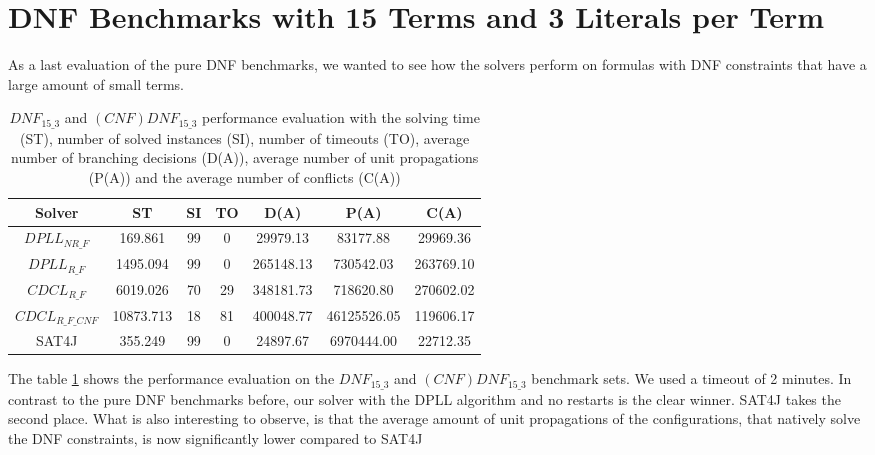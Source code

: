 \section{DNF Benchmarks with 15 Terms and 3 Literals per Term}
\label{sec:dnf153}

As a last evaluation of the pure DNF benchmarks, we wanted to see how the solvers perform on formulas with DNF constraints that have a large amount of small terms.

\begin{table}[!htb]
\centering
\caption[$DNF_{15\_3}$ and $(CNF)DNF_{15\_3}$ performance evaluation]{$DNF_{15\_3}$ and $(CNF)DNF_{15\_3}$ performance evaluation with the solving time (ST), number of solved instances (SI), number of timeouts (TO), average number of branching decisions (D(A)), average number of unit propagations (P(A)) and the average number of conflicts (C(A))}
\label{tab:dnf153Sat}
\begin{tabular}{|c|c|c|c|c|c|c|}
\hline
Solver & ST & SI & TO & D(A) & P(A) & C(A)\\ 
\hline
$DPLL_{NR\_F}$ & 169.861 & 99 & 0 & 29979.13 & 83177.88 & 29969.36 \\ 
\hline
$DPLL_{R\_F}$ & 1495.094 & 99 & 0 & 265148.13 & 730542.03 & 263769.10 \\ 
\hline
$CDCL_{R\_F}$ & 6019.026 & 70 & 29 & 348181.73 & 718620.80 & 270602.02 \\ 
\hline
$CDCL_{R\_F\_CNF}$ & 10873.713 & 18 & 81 & 400048.77 & 46125526.05 & 119606.17 \\ 
\hline
SAT4J & 355.249 & 99 & 0 & 24897.67 & 6970444.00 & 22712.35 \\ 
\hline
\end{tabular}
\end{table}

The table \ref{tab:dnf153Sat} shows the performance evaluation on the $DNF_{15\_3}$ and $(CNF)DNF_{15\_3}$ benchmark sets. We used a timeout of 2 minutes. In contrast to the pure DNF benchmarks before, our solver with the DPLL algorithm and no restarts is the clear winner. SAT4J takes the second place. What is also interesting to observe, is that the average amount of unit propagations of the configurations, that natively solve the DNF constraints, is now significantly lower compared to SAT4J

